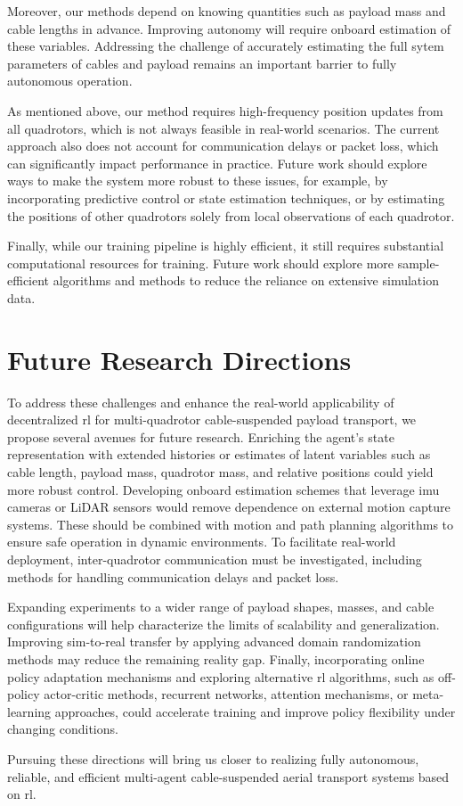Moreover, our methods depend on knowing quantities such as payload mass and cable lengths in advance. Improving autonomy will require onboard estimation of these variables. Addressing the challenge of accurately estimating the full sytem parameters of cables and payload remains an important barrier to fully autonomous operation.

As mentioned above, our method requires high-frequency position updates from all quadrotors, which is not always feasible in real-world scenarios. The current approach also does not account for communication delays or packet loss, which can significantly impact performance in practice. Future work should explore ways to make the system more robust to these issues, for example, by incorporating predictive control or state estimation techniques, or by estimating the positions of other quadrotors solely from local observations of each quadrotor.

Finally, while our training pipeline is highly efficient, it still requires substantial computational resources for training. Future work should explore more sample-efficient algorithms and methods to reduce the reliance on extensive simulation data.

\section{Future Research Directions}
To address these challenges and enhance the real-world applicability of decentralized \gls{rl} for multi-quadrotor cable-suspended payload transport, we propose several avenues for future research. Enriching the agent's state representation with extended histories or estimates of latent variables such as cable length, payload mass, quadrotor mass, and relative positions could yield more robust control. Developing onboard estimation schemes that leverage \gls{imu} cameras or LiDAR sensors would remove dependence on external motion capture systems. These should be combined with motion and path planning algorithms to ensure safe operation in dynamic environments. To facilitate real-world deployment, inter-quadrotor communication must be investigated, including methods for handling communication delays and packet loss.

Expanding experiments to a wider range of payload shapes, masses, and cable configurations will help characterize the limits of scalability and generalization. Improving sim-to-real transfer by applying advanced domain randomization methods may reduce the remaining reality gap. Finally, incorporating online policy adaptation mechanisms and exploring alternative \gls{rl} algorithms, such as off-policy actor-critic methods, recurrent networks, attention mechanisms, or meta-learning approaches, could accelerate training and improve policy flexibility under changing conditions.

Pursuing these directions will bring us closer to realizing fully autonomous, reliable, and efficient multi-agent cable-suspended aerial transport systems based on \gls{rl}.